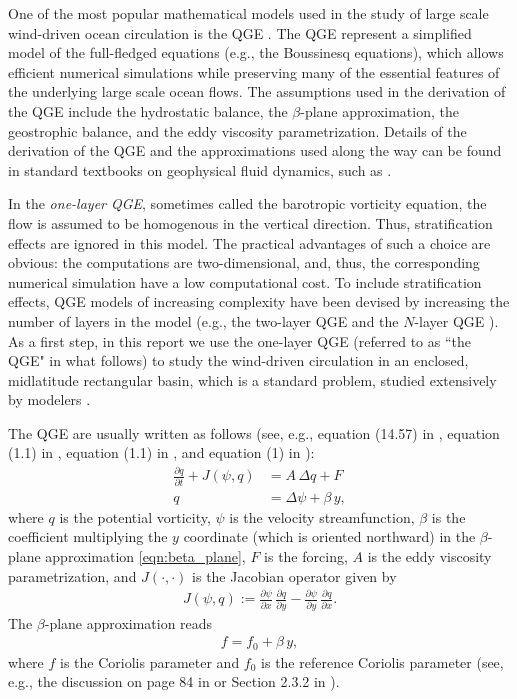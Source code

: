 One of the most popular mathematical models used in the study of large scale
wind-driven ocean circulation is the QGE \cite{Cushman11,Vallis06}. The QGE
represent a simplified model of the full-fledged equations (e.g., the Boussinesq
equations), which allows efficient numerical simulations while preserving many
of the essential features of the underlying large scale ocean flows. The
assumptions used in the derivation of the QGE include the hydrostatic balance,
the $\beta$-plane approximation, the geostrophic balance, and the eddy viscosity
parametrization.  Details of the derivation of the QGE and the approximations
used along the way can be found in standard textbooks on geophysical fluid
dynamics, such as
\cite{Cushman11,Majda,Majda03,McWilliams06,Pedlosky92,Vallis06}.

In the \emph{one-layer QGE}, sometimes called the barotropic vorticity equation,
the flow is assumed to be homogenous in the vertical direction. Thus,
stratification effects are ignored in this model.  The practical advantages of
such a choice are obvious: the computations are two-dimensional, and, thus, the
corresponding numerical simulation have a low computational cost. To include
stratification effects, QGE models of increasing complexity have been devised by
increasing the number of layers in the model (e.g., the two-layer QGE and the
$N$-layer QGE \cite{Vallis06}). As a first step, in this report we use the
one-layer QGE (referred to as ``the QGE" in what follows) to study the
wind-driven circulation in an enclosed, midlatitude rectangular basin, which is
a standard problem, studied extensively by modelers \cite{Cushman11, Layton08,
Majda03, Majda, McWilliams06, Vallis06, Pedlosky92}.

The QGE are usually written as follows (see, e.g., equation (14.57) in
\cite{Vallis06}, equation (1.1) in \cite{Majda}, equation (1.1) in
\cite{Wang94}, and equation (1) in \cite{Greatbatch00}):
\begin{align}
  \frac{\partial q}{\partial t} + J(\psi , q) &= A \, \Delta q + F
    \label{qge_q_psi_dim_1} \\
  q &= \Delta \psi + \beta \, y , \label{qge_q_psi_dim_2}
\end{align}
where $q$ is the potential vorticity, $\psi$ is the velocity streamfunction,
$\beta$ is the coefficient multiplying the $y$ coordinate (which is oriented
northward) in the $\beta$-plane approximation \eqref{eqn:beta_plane}, $F$ is the
forcing, $A$ is the eddy viscosity parametrization, and $J(\cdot , \cdot)$ is
the Jacobian operator given by
\begin{align}
  J(\psi , q) := \frac{\partial \psi}{\partial x} \, \frac{\partial q}{\partial y} -
    \frac{\partial \psi}{\partial y} \, \frac{\partial q}{\partial x} . \label{eqn:jacobian}
\end{align}
The $\beta$-plane approximation reads
\begin{align}
  f = f_0 + \beta \, y , \label{eqn:beta_plane}
\end{align}
where $f$ is the Coriolis parameter and $f_0$ is the reference Coriolis
parameter (see, e.g., the discussion on page 84 in \cite{Cushman94} or Section
2.3.2 in \cite{Vallis06}).

